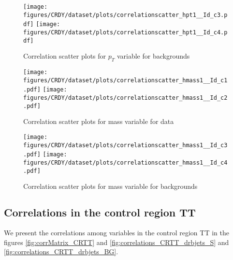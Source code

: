 \begin{figure}[!htb]%
\centering
\texttt{[image: figures/CRDY/dataset/plots/correlationscatter\_hpt1\_\_Id\_c3.pdf]}
\texttt{[image: figures/CRDY/dataset/plots/correlationscatter\_hpt1\_\_Id\_c4.pdf]}
\caption{ Correlation scatter plots for \HBB $p_{T}$ variable for backgrounds}%
\label{fig:correlations_CRDY_hpt1_BG}                                                       
\end{figure}\clearpage



\begin{figure}[!htb]%
\centering
\texttt{[image: figures/CRDY/dataset/plots/correlationscatter\_hmass1\_\_Id\_c1.pdf]}
\texttt{[image: figures/CRDY/dataset/plots/correlationscatter\_hmass1\_\_Id\_c2.pdf]}
\caption{ Correlation scatter plots for \HBB mass  variable for data}%
\label{fig:correlations_CRDY_hmass1_S}                                                       
\end{figure}\clearpage


\begin{figure}[!htb]%
\centering
\texttt{[image: figures/CRDY/dataset/plots/correlationscatter\_hmass1\_\_Id\_c3.pdf]}
\texttt{[image: figures/CRDY/dataset/plots/correlationscatter\_hmass1\_\_Id\_c4.pdf]}
\caption{ Correlation scatter plots for \HBB mass variable for backgrounds}%
\label{fig:correlations_CRDY_hmass1_BG}                                                       
\end{figure}\clearpage
 

\subsection{Correlations in the control region TT}
We present the correlations among variables in the control region TT in the figures \ref{fig:corrMatrix_CRTT} and \ref{fig:correlations_CRTT_drbjets_S} and \ref{fig:correlations_CRTT_drbjets_BG}.

